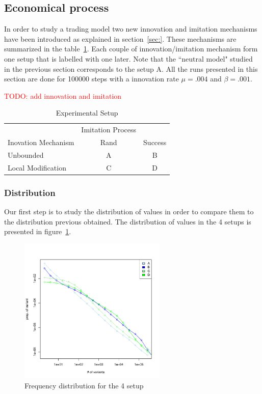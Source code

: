 \documentclass{wscpaperproc}
\newcommand{\memo}[2]{\textcolor{#1}{#2}}
\newcommand{\todo}[1]{\memo{red}{TODO: #1\\}}
\begin{document}
\subsection{ Economical  process}

In order to study a trading model two new innovation and imitation mechanisms have been introduced as explained in section~\ref{sec:}. These mechanisms are summarized in the table~\ref{tab:exp}. Each couple of innovation/imitation mechanism form one setup that is labelled with one later. Note that the ``neutral model" studied in the previous section corresponds to the setup A. All the runs presented in this section are done for 100000 steps with a innovation rate $\mu=.004$ and $\beta=.001$.

\todo{add innovation and imitation}
\begin{table}[h]
	\centering
	\begin{tabular}{l|cc}
					&Imitation  Process \\
		Inovation Mechanism	& Rand & Success \\\hline  
		Unbounded 		&A & B \\
		Local Modification	& C & D \\
	\end{tabular}
	\caption{Experimental Setup}
	\label{tab:exp}
\end{table}

\subsubsection{Distribution}


Our first step is to study the distribution of values in order to compare them to the distribution previous obtained. The distribution of values in the 4 setups is presented in figure~\ref{fig:4setDi}. 

\begin{figure}[H]
	\begin{center}
		\includegraphics[width=7cm]{img/frequenciesABCD.pdf}
	\end{center}
	\caption{Frequency distribution for the 4 setup}
	\label{fig:4setDi}
\end{figure}
\end{document}
